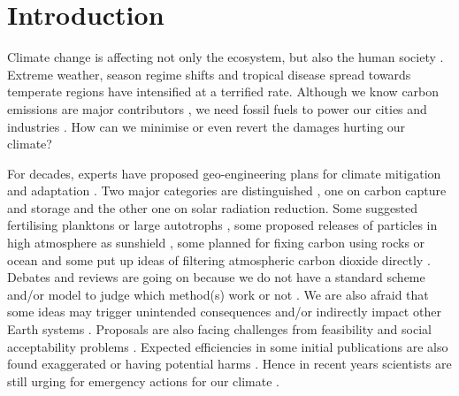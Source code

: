 \documentclass[../thesis.tex]{subfiles} %
\begin{document}
\section{Introduction}

Climate change is affecting not only the ecosystem, but also the human society \autocite{notz2016observed,schuur2015climate}.  Extreme weather, season regime shifts and tropical disease spread towards temperate regions have intensified at a terrified rate.  Although we know carbon emissions are major contributors \autocite{notz2016observed}, we need fossil fuels to power our cities and industries \autocite{ferguson2000electricity}.  How can we minimise or even revert the damages hurting our climate?

For decades, experts have proposed geo-engineering plans for climate mitigation and adaptation \autocite{farrelly2013carbon,yang2008progress,boyd2008ranking,boettcher2019high,vaughan2011review}.  Two major categories are distinguished \autocite{boyd2008ranking}, one on carbon capture and storage and the other one on solar radiation reduction.  Some suggested fertilising planktons \autocite{gnanadesikan2008export,lovelock2007ocean,lawrence2014efficiency} or large autotrophs \autocite{duarte2017can,johannessen2016geoengineering,krause2016substantial}, some proposed releases of particles in high atmosphere as sunshield \autocite{latham2008global,stjern2018response}, some planned for fixing carbon using rocks \autocite{stephens2008assessing,gunnarsson2018rapid} or ocean \autocite{salter200920,sant2014offshore} and some put up ideas of filtering atmospheric carbon dioxide directly \autocite{broecker2007co2,williamson2016emissions}.  Debates and reviews are going on because we do not have a standard scheme and/or model to judge which method(s) work or not \autocite{boyd2008ranking,boettcher2019high,boyd2016development,oschlies2017indicators,gattuso2018ocean}.  We are also afraid that some ideas may trigger unintended consequences \autocite{chung2011using,kwiatkowski2015atmospheric,lauvset2017climate,williamson2012impacts,trias2017high} and/or indirectly impact other Earth systems \autocite{ridgwell2011geographical,xia2016stratospheric,bala2011albedo}.  Proposals are also facing challenges from feasibility and social acceptability problems \autocite{boyd2008ranking,kamishiro2009public}.  Expected efficiencies in some initial publications are also found exaggerated \autocite{boyd2008implications,gnanadesikan2008export,oschlies2010side,thiele2012microbial} or having potential harms \autocite{batten2014did,trick2010iron,jones2009climate,muri2015tropical}.  Hence in recent years scientists are still urging for emergency actions for our climate \autocite{lenton2019foresight,van2017open}.
\end{document}
